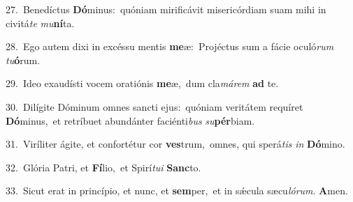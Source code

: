 {\numbfont\textcolor{\numbcolor}{27.}}~Benedíctus \textbf{Dó}\-minus:~\star quóniam mirificávit misericórdiam suam mihi in civitá\textit{te} \textit{mu}\-\textbf{ní}ta.\par
{\numbfont\textcolor{\numbcolor}{28.}}~Ego autem dixi in excéssu mentis \textbf{me}\-æ:~\star Projéctus sum a fácie oculó\textit{rum} \textit{tu}\-\textbf{ó}rum.\par
{\numbfont\textcolor{\numbcolor}{29.}}~Ideo exaudísti vocem oratiónis \textbf{me}\-æ,~\star dum cla\-\textit{má}\-\textit{rem} \textbf{ad} te.\par
{\numbfont\textcolor{\numbcolor}{30.}}~Dilígite Dóminum omnes sancti ejus:~\dagger quóniam veritátem requíret \textbf{Dó}\-minus,~\star et retríbuet abundánter faciénti\textit{bus} \textit{su}\-\textbf{pér}biam.\par
{\numbfont\textcolor{\numbcolor}{31.}}~Viríliter ágite, et confortétur cor \textbf{ves}\-trum,~\star omnes, qui sperá\textit{tis} \textit{in} \textbf{Dó}\-mino.\par
{\numbfont\textcolor{\numbcolor}{32.}}~Glória Patri, et \textbf{Fí}\-lio,~\star et Spirí\-\textit{tu}\-\textit{i} \textbf{Sanc}\-to.\par
{\numbfont\textcolor{\numbcolor}{33.}}~Sicut erat in princípio, et nunc, et \textbf{sem}\-per,~\star et in sǽcula sæcu\-\textit{ló}\-\textit{rum}. \textbf{A}\-men.\par
